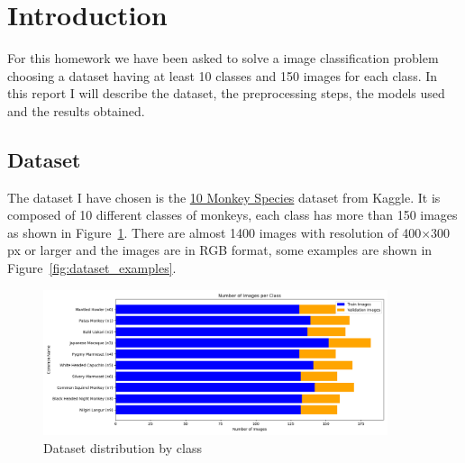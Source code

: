 \section{Introduction}
For this homework we have been asked to solve a image classification problem choosing a dataset having at least 10 classes and 150 images for each class.
In this report I will describe the dataset, the preprocessing steps, the models used and the results obtained.

\subsection{Dataset}
The dataset I have chosen is the \href{https://www.kaggle.com/slothkong/10-monkey-species}{10 Monkey Species} dataset from Kaggle.
It is composed of 10 different classes of monkeys, each class has more than 150 images as shown in Figure~\ref{fig:dataset_distribution}.
There are almost 1400 images with resolution of 400$\times$300 px or larger and the images are in RGB format, some examples are shown in Figure~\ref{fig:dataset_examples}.

\begin{figure}[h]
    \centering
    \includegraphics[width=0.9\textwidth]{../plot/monkey_labels.png}
    \caption{Dataset distribution by class}
    \label{fig:dataset_distribution}
\end{figure}


